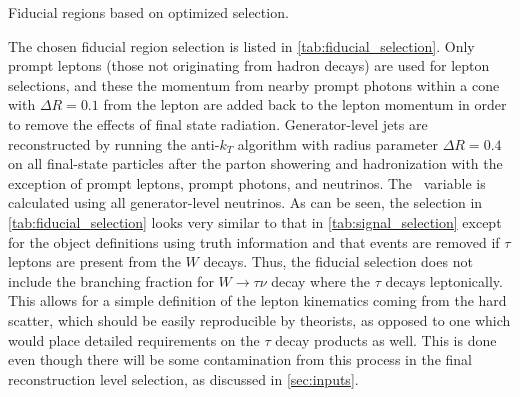 \begin{table}[ht!]
\centering
\begin{small}

\end{small}
\caption{Fiducial regions based on optimized selection.}
\label{tab:fiducial_selection}
\end{table}

The chosen fiducial region selection 
is listed in \tab\ref{tab:fiducial_selection}.
Only prompt leptons (those not originating from hadron decays) are used for 
lepton selections, and these the momentum from nearby prompt photons 
within a cone with $\Delta R = 0.1$ from the lepton are added
back to the lepton momentum in order to remove the effects of final 
state radiation. Generator-level jets are 
reconstructed by running the anti-$k_T$ algorithm with radius 
parameter $\Delta R = 0.4$ on all final-state particles 
after the parton showering and hadronization with the exception of prompt 
leptons, prompt photons, and neutrinos. The \MET~variable is calculated 
using all generator-level neutrinos. 
As can be seen, the selection 
in \tab\ref{tab:fiducial_selection} looks very similar to that in 
\tab\ref{tab:signal_selection} except for the object definitions
using truth information and that 
events are removed if $\tau$ leptons are present from the $W$ decays.  
Thus, the fiducial selection
does not include the branching fraction for $W\rightarrow\tau\nu$ decay 
where the $\tau$ decays leptonically. This allows for a simple definition
of the lepton kinematics coming from the hard scatter, 
which should be easily reproducible by theorists,
as opposed to one which would place detailed requirements on the $\tau$ decay
products as well.
This is done even though there will be some contamination from this process in the final 
reconstruction level selection, as discussed in \sec\ref{sec:inputs}.



